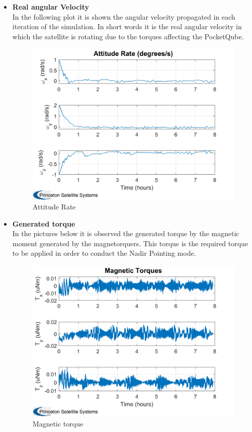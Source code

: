 \begin{itemize}
    \item \textbf{Real angular Velocity}\\
    In the following plot it is shown the angular velocity propagated in each iteration of the simulation. In short
    words it is the real angular velocity in which the satellite is rotating due to the torques affecting the PocketQube.
    
    \begin{figure}[H]
        \centering
        \includegraphics[width=0.7\linewidth]{res/img/Nadir_no_EKF/Attitude Rate.png}
        \caption{Attitude Rate}
        \label{fig:AttitudeRate}
    \end{figure}

    \item \textbf{Generated torque}\\
    In the pictures below it is observed the generated torque by the magnetic moment generated by the magnetorquers.
    This torque is the required torque to be applied in order to conduct the Nadir Pointing mode.
    \begin{figure}[H]
        \centering
        \includegraphics[width=0.7\linewidth]{res/img/Nadir_no_EKF/Magnetic Torques.png}
        \caption{Magnetic torque}
        \label{fig:Magnetic torque}
    \end{figure}


\end{itemize}

